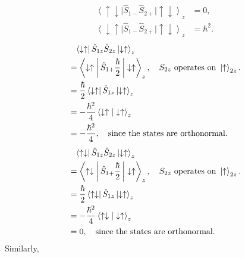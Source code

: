 \documentclass[12pt]{article}
\begin{document}
\begin{enumerate}[1.]
$$\begin{aligned}
             \left \langle \uparrow \downarrow \right | \hat{S}_{1-} \hat{S}_{2+} \left | \uparrow \downarrow \right \rangle _z & = 0, \\
             \left \langle \downarrow \uparrow \right | \hat{S}_{1-} \hat{S}_{2+} \left | \uparrow \downarrow \right \rangle _z & = \hbar^2.
       \end{aligned}
       $$
       $$
       \begin{aligned}
             & \hphantom{=} \left \langle \downarrow \uparrow \right | \hat{S}_{1z} \hat{S}_{2z} \left | \downarrow \uparrow \right \rangle _z  \\
              & = \left \langle \downarrow \uparrow \vphantom{\frac{\hbar}{2}} \right | \hat{S}_{1+}\frac{\hbar}{2} \left |\vphantom{\frac{\hbar}{2}} \downarrow \uparrow \right \rangle _z , \quad S_{2z}\mbox{ operates on }\left|\uparrow \right \rangle _{2z}. \\
              &= \frac{\hbar}{2} \left \langle \downarrow \uparrow \right | \hat{S}_{1z} \left | \downarrow \uparrow \right \rangle _z  \\
              & = -\frac{\hbar^2}{4} \left \langle \downarrow \uparrow \vphantom{.}\right  | \left. \downarrow \uparrow \right \rangle _z  \\
              & = -\frac{\hbar^2}{4}, \quad \mbox{since the states are orthonormal.}
        \end{aligned}
       $$
       $$
       \begin{aligned}
             & \hphantom{=} \left \langle \uparrow \downarrow \right | \hat{S}_{1z} \hat{S}_{2z} \left | \downarrow \uparrow \right \rangle _z  \\
              & = \left \langle \uparrow \downarrow \vphantom{\frac{\hbar}{2}} \right | \hat{S}_{1+}\frac{\hbar}{2} \left |\vphantom{\frac{\hbar}{2}} \downarrow \uparrow \right \rangle _z , \quad S_{2z}\mbox{ operates on }\left|\uparrow \right \rangle _{2z}. \\
              &= \frac{\hbar}{2} \left \langle \uparrow \downarrow \right | \hat{S}_{1z} \left | \downarrow \uparrow \right \rangle _z  \\
              & = -\frac{\hbar^2}{4} \left \langle \uparrow \downarrow \vphantom{.}\right  | \left. \downarrow \uparrow \right \rangle _z  \\
              & = 0, \quad \mbox{since the states are orthonormal.}
        \end{aligned}
       $$
       Similarly, 
       $$
       \begin{aligned}

\end{aligned}$$
\end{enumerate}
\end{document}

